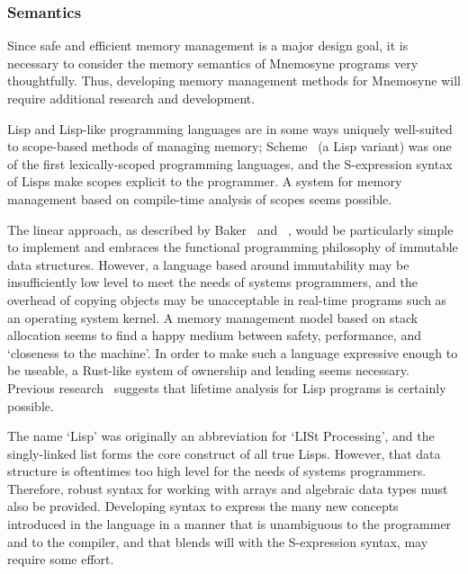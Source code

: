 \documentclass[11pt,a4paper]{article}
\theoremstyle{break}
\begin{document}
\subsubsection{Semantics}

Since safe and efficient memory management is a major design goal, it is necessary to consider the memory semantics of Mnemosyne programs very thoughtfully. Thus, developing memory management methods for Mnemosyne will require additional research and development.

Lisp and Lisp-like programming languages are in some ways uniquely well-suited to scope-based methods of managing memory; Scheme~\cite{r6rs} (a Lisp variant) was one of the first lexically-scoped programming languages, and the S-expression syntax of Lisps make scopes explicit to the programmer. A system for memory management based on compile-time analysis of scopes seems possible.

The linear approach, as described by Baker~\cite{Baker:1992:LLL:142137.142162,Baker:1995:UVL:199818.199860} and \citeauthor{hawblitzel2004low}~\cite{hawblitzel2004low}, would be particularly simple to implement and embraces the functional programming philosophy of immutable data structures. However, a language based around immutability may be insufficiently low level to meet the needs of systems programmers, and the overhead of copying objects may be unacceptable in real-time programs such as an operating system kernel. A memory management model based on stack allocation seems to find a happy medium between safety, performance, and `closeness to the machine'. In order to make such a language expressive enough to be useable, a Rust-like system of ownership and lending seems necessary. Previous research~\cite{sobalvarro1988lifetime} suggests that lifetime analysis for Lisp programs is certainly possible.

The name `Lisp' was originally an abbreviation for `LISt Processing', and the singly-linked list forms the core construct of all true Lisps. However, that data structure is oftentimes too high level for the needs of systems programmers. Therefore, robust syntax for working with arrays and algebraic data types must also be provided. Developing syntax to express the many new concepts introduced in the language in a manner that is unambiguous to the programmer and to the compiler, and that blends will with the S-expression syntax, may require some effort.
\end{document}
